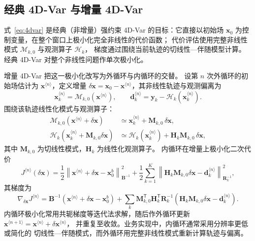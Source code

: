 \documentclass[11pt,a4paper]{article}
\newcommand{\T}{\mathsf T}
\newcommand{\xx}{\mathbf x}
\newcommand{\yy}{\mathbf y}
\newcommand{\dd}{\mathbf d}
\newcommand{\norm}[2]{\left\|#1\right\|_{#2}}
\begin{document}
\subsection{经典 4D-Var 与增量 4D-Var}

式~\eqref{eq:4dvar} 是经典（非增量）强约束 4D-Var 的目标：它直接以初始场
$\xx_0$ 为控制变量，在整个窗口上极小化完全非线性的代价函数；
代价评估使用完整非线性模式 $\mathcal M_{k,0}$ 与观测算子 $\mathcal H_k$，
梯度通过围绕当前轨迹的切线性—伴随模型计算。
经典 4D-Var 对整个非线性问题作单次极小化。

增量 4D-Var 把这一极小化改写为外循环与内循环的交替。
设第 $n$ 次外循环的初始场估计为 $\xx^{\langle n\rangle}$，定义增量
$\delta\xx=\xx_0-\xx^{\langle n\rangle}$，其非线性轨迹与观测偏离为
\begin{equation}
 \xx_k^{\langle n\rangle}=\mathcal M_{k,0}(\xx^{\langle n\rangle}),
 \qquad
 \dd_k^{\langle n\rangle}=\yy_k-\mathcal H_k(\xx_k^{\langle n\rangle}).
\end{equation}
围绕该轨迹线性化模式与观测算子：
\begin{align}
 \mathcal M_{k,0}(\xx^{\langle n\rangle}+\delta\xx)
 &\simeq\xx_k^{\langle n\rangle}+\mathbf M_{k,0}\,\delta\xx,\\
 \mathcal H_k(\xx_k^{\langle n\rangle}+\mathbf M_{k,0}\delta\xx)
 &\simeq\mathcal H_k(\xx_k^{\langle n\rangle})
 +\mathbf H_k\mathbf M_{k,0}\,\delta\xx,
\end{align}
其中 $\mathbf M_{k,0}$ 为切线性模式，$\mathbf H_k$ 为线性化观测算子。
内循环在增量上极小化二次代价
\begin{equation}
 J^{\langle n\rangle}(\delta\xx)
 =\frac12\norm{\xx^{\langle n\rangle}+\delta\xx-\xx_0^b}{\mathbf B^{-1}}^2
 +\frac12\sum_{k=1}^K
 \norm{\mathbf H_k\mathbf M_{k,0}\delta\xx-\dd_k^{\langle n\rangle}}
 {\mathbf R_k^{-1}}^2,
 \label{eq:incrJ}
\end{equation}
其梯度为
\begin{equation}
 \nabla_{\delta\xx}J^{\langle n\rangle}
 =\mathbf B^{-1}(\xx^{\langle n\rangle}+\delta\xx-\xx_0^b)
 +\sum_k\mathbf M_{k,0}^\T\mathbf H_k^\T\mathbf R_k^{-1}
 (\mathbf H_k\mathbf M_{k,0}\delta\xx-\dd_k^{\langle n\rangle}).
\end{equation}
内循环极小化常用共轭梯度等迭代法求解，随后作外循环更新
$\xx^{\langle n+1\rangle}
=\xx^{\langle n\rangle}+\delta\xx^{\langle n\rangle}$，
并重复至收敛。业务实现中，内循环通常采用分辨率更低或简化的
切线性—伴随模式，而外循环用完整非线性模式重新计算轨迹与偏离。
\end{document}
